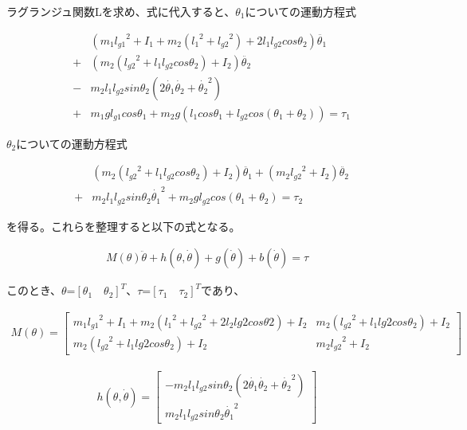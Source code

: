 ラグランジュ関数Lを求め、式に代入すると、$\theta_{1}$についての運動方程式

\begin{eqnarray}
  &&(m_{1}{l_{g1}}^2 + I_{1} + m_{2}({l_{1}}^2 + {l_{g2}}^2)
  + 2l_{1}l_{g2}cos\theta_{2})\ddot{\theta_{1}} \nonumber \\
  &+& (m_{2}({l_{g2}}^2 + l_{1}l_{g2}cos\theta_{2}) + I_{2})\ddot{\theta_{2}} \nonumber \\
  &-& m_{2}l_{1}l_{g2}sin\theta_{2}(2\dot{\theta_{1}}\dot{\theta_{2}} + {\dot{\theta_{2}}}^2)  \nonumber \\
  &+& m_{1}gl_{g1}cos\theta_{1} + m_{2}g(l_{1}cos\theta_{1} + l_{g2}cos(\theta_{1} + \theta_{2})) = \tau_{1}
\end{eqnarray}

$\theta_{2}$についての運動方程式

\begin{eqnarray}
  &&(m_{2}({l_{g2}}^2 + l_{1}l_{g2}cos\theta_{2}) + I_{2})\ddot{\theta_{1}} + (m_{2}{l_{g2}}^2 + I_{2})\ddot{\theta_{2}} \nonumber \\
  &+& m_{2}l_{1}l_{g2}sin\theta_{2}{\dot{\theta_{1}}}^2 + m_{2}gl_{g2}cos(\theta_{1} + \theta_{2}) = \tau_{2}
\end{eqnarray}

を得る。これらを整理すると以下の式となる。

\begin{eqnarray}
  M(\theta)\ddot{\theta} + h(\theta, \dot{\theta}) + g(\dot{\theta}) + b(\dot{\theta}) = \tau
\end{eqnarray}

このとき、$\theta$=${[\theta_{1} \quad \theta_{2}]}^T$、$\tau$=${[\tau_{1} \quad \tau_{2}]}^T$であり、

\begin{align}
  M(\theta)= 
            \begin{bmatrix}
              m_{1}{l_{g1}}^2 + I_{1} + m_{2}({l_{1}}^2 + {l_{g2}}^2 + 2l_{2}l{g2}cos\theta{2}) + I_{2} & m_{2}({l_{g2}}^2 + l_{1}l{g2}cos\theta_{2}) + I_{2} \\
              m_{2}({l_{g2}}^2 + l_{1}l{g2}cos\theta_{2}) + I_{2} & m_{2}{l_{g2}}^2 + I_{2}
            \end{bmatrix}
\end{align}

\begin{eqnarray}
  h(\theta, \dot{\theta})=
            \begin{bmatrix}
              -m_{2}l_{1}l_{g2}sin\theta_{2}(2\dot{\theta_{1}}\dot{\theta_{2}} + {\dot{\theta_{2}}}^2) \\
              m_{2}l_{1}l_{g2}sin\theta_{2}{\dot{\theta_{1}}}^2
            \end{bmatrix}
\end{eqnarray}

